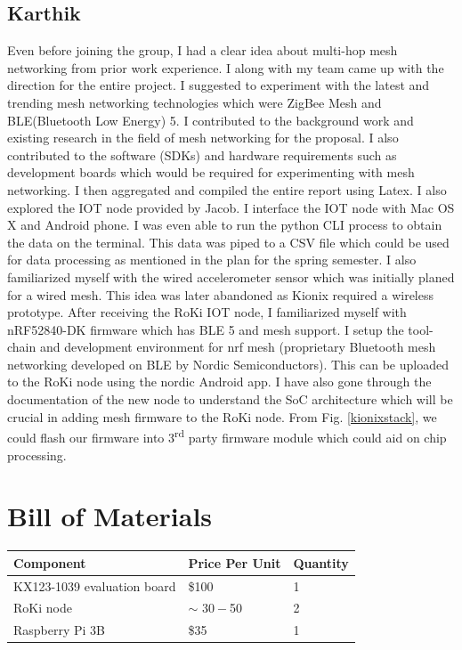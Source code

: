 \documentclass[11pt, a4paper]{article}
\begin{document}
\subsection{Karthik}
Even before joining the group, I had a clear idea about multi-hop mesh networking from prior work experience. I along with my team came up with the direction for the entire project. I suggested to experiment with the latest and trending mesh networking technologies which were ZigBee Mesh and BLE(Bluetooth Low Energy) 5. I contributed to the background work and existing research in the field of mesh networking for the proposal. I also contributed to the software (SDKs) and hardware requirements such as development boards which would be required for experimenting with mesh networking. I then aggregated and  compiled the entire report using Latex. I also explored the IOT node provided by Jacob. I interface the IOT node with Mac OS X and Android phone. I was even able to run the python CLI process to obtain the data on the terminal. This data was piped to a CSV file which could be used for data processing as mentioned in the plan for the spring semester. I also familiarized myself with the wired accelerometer sensor which was initially planed for a wired mesh. This idea was later abandoned as Kionix required a wireless prototype. After receiving the RoKi IOT node, I familiarized myself with nRF52840-DK firmware which has BLE 5 and mesh support. I setup the tool-chain and development environment for nrf mesh (proprietary Bluetooth mesh networking developed on BLE by Nordic Semiconductors). This can be uploaded to the RoKi node using the nordic Android app. I have also gone through the documentation of the new node to understand the SoC architecture which will be crucial in adding mesh firmware to the RoKi node. From Fig. \ref{kionixstack}, we could flash our firmware into 3\textsuperscript{rd} party firmware module which could aid on chip processing.

\section{Bill of Materials}
\begin{table}[h!]
	\begin{tabular}{|l|l|l|}
		\hline
		Component & Price Per Unit & Quantity \\ \hline
		KX123-1039 evaluation board & \$100 & 1 \\ \hline
		RoKi node & $\sim$ $30 - $50 & 2 \\ \hline
		Raspberry Pi 3B & \$35 & 1 \\ \hline
	\end{tabular}
\end{table}
\end{document}
